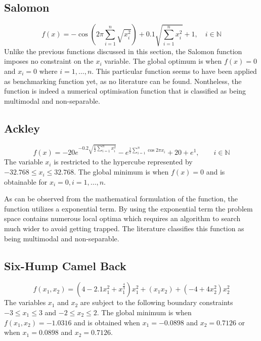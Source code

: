 \subsection{Salomon}
\begin{equation}
	f(x) = -\cos{(2\pi\sum_{i=1}^n\sqrt{x_i^2})} + 0.1 \sqrt{\sum_{i=1}^n x_i^2} + 1, \quad i \in \mathbb{N}
\end{equation}
Unlike the previous functions discussed in this section, the Salomon function imposes no constraint on the $x_i$ variable. The global optimum is when $f(x) = 0$ and $x_i = 0$ where $i = 1,\ldots,n$. This particular function seems to have been applied as benchmarking function yet, as no literature can be found. Nontheless, the function is indeed a numerical optimisation function that is classified as being multimodal and non-separable\cite{http://www.it.lut.fi/ip/evo/functions/node12.html}.
\subsection{Ackley}
\begin{equation}
	f(x) = -20e^{-0.2\sqrt{\frac{1}{2}\sum_{i=1}^n x_i^2}} - e^{\frac{1}{2}\sum_{i=1}^n\cos{2\pi x_i}} + 20 + e^1, \qquad i \in \mathbb{N}
\end{equation}
The variable $x_i$ is restricted to the hypercube represented by $-32.768 \leq x_i \leq 32.768$\cite{numericalABC,ABCCompareStudy,ARPSO,TestFunctions}. The global minimum is when $f(x) = 0$ and is obtainable for $x_i = 0, i = 1,\ldots,n$\cite{numericalABC,ABCCompareStudy,ARPSO,TestFunctions}.

As can be observed from the mathematical formulation of the function, the function utilizes a exponential term. By using the exponential term the problem space contains numerous local optima which requires an algorithm to search much wider to avoid getting trapped. The literature classifies this function as being multimodal and non-separable\cite{adaptPSO,ABCCompareStudy,numericalABC,TestFunctions}.
\subsection{Six-Hump Camel Back}
\begin{equation}
	f(x_1,x_2) = (4 - 2.1x_1^2 + x_1^{\frac{4}{3}})x_1^2 + (x_1x_2) + (-4 + 4x_2^2)x_2^2
\end{equation}
The variables $x_1$ and $x_2$ are subject to the following boundary constraints $-3 \leq x_1 \leq 3$ and $-2 \leq x_2 \leq 2$\cite{DistributedHierarchicalGA,TestFunctions}. The global minimum is when $f(x_1,x_2) = -1.0316$ and is obtained when $x_1 = -0.0898$ and $x_2 = 0.7126$ or when  $x_1 = 0.0898$ and $x_2 = 0.7126$\cite{DistributedHierarchicalGA,TestFunctions}. 

